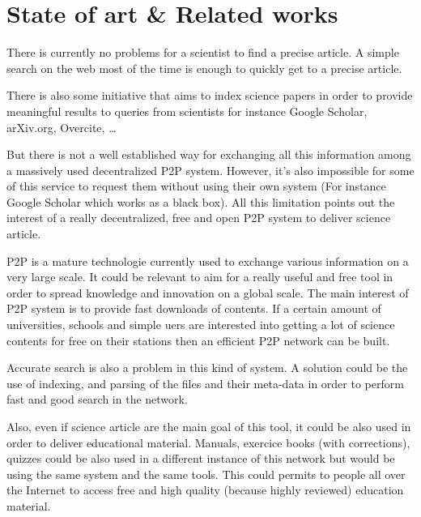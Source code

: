 \section{State of art \& Related works}

There is currently no problems for a scientist to find a precise article.
A simple search on the web most of the time is enough to quickly get to a precise
article. 

There is also some initiative that aims to index science papers in order
to provide meaningful results to queries from scientists for instance Google Scholar,
arXiv.org, Overcite, \ldots 

But there is not a well established way for exchanging all this information
among a massively used decentralized P2P system. However, it's also impossible for some of this service to
request them without using their own system (For instance Google Scholar which works
as a black box). All this limitation
points out the interest of a really decentralized, free and open P2P system to deliver science 
article.

P2P is a mature technologie currently used to exchange various information on a very large
scale. It could be relevant to aim for a really useful and free tool in order to spread knowledge and
innovation on a global scale. The main interest of P2P system is to provide fast downloads of contents.
If a certain amount of universities, schools and simple uers are interested into getting a lot of science contents
for free on their stations then an efficient P2P network can be built.

Accurate search is also a problem in this kind of system.
A solution could be the use of indexing, and parsing of the files and their meta-data in order to
perform fast and good search in the network.

Also, even if science article are the main goal of this tool, it could be also used in order to
deliver educational material. Manuals, exercice books (with corrections), quizzes could be also used
in a different instance of this network but would be using the same system and the same tools. This could
permits to people all over the Internet to access free and high quality (because highly reviewed)
education material.

